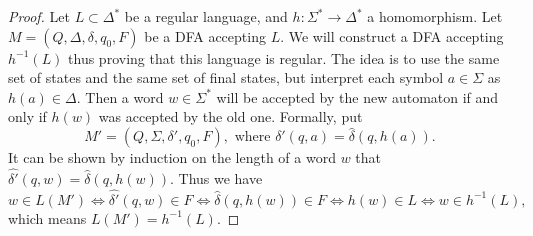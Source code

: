 \begin{proof}
Let $L \subset \Delta^*$ be a regular language, and $h \colon \Sigma^* \to \Delta^*$ a homomorphism.
Let $M = (Q, \Delta, \delta, q_0, F)$ be a DFA accepting $L$.
We will construct a DFA accepting $h^{-1}(L)$ thus proving that this language is regular.
The idea is to use the same set of states and the same set of final states, but interpret each symbol $a \in \Sigma$ as $h(a) \in \Delta$.
Then a word $w \in \Sigma^*$ will be accepted by the new automaton if and only if $h(w)$ was accepted by the old one.
Formally, put
\[
M' = (Q, \Sigma, \delta', q_0, F), \text{ where }\delta'(q, a) = \widehat{\delta}(q, h(a)).
\]
It can be shown by induction on the length of a word $w$ that $\widehat{\delta'}(q, w) = \widehat{\delta}(q, h(w))$.
Thus we have
\[
w \in L(M') \Leftrightarrow \widehat{\delta'}(q, w) \in F \Leftrightarrow \widehat{\delta}(q, h(w)) \in F \Leftrightarrow h(w) \in L
\Leftrightarrow w \in h^{-1}(L),
\]
which means $L(M') = h^{-1}(L)$.
\end{proof}




